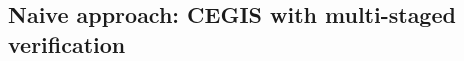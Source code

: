 \documentclass[runningheads,a4paper]{llncs}
\begin{document}

\subsection{Naive approach: CEGIS with multi-staged verification}
\label{sec:CEGIS-precision-incrementation}
\end{document}
